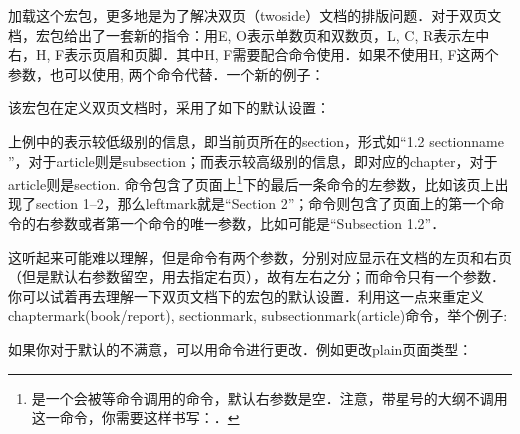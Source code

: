 加载这个宏包，更多地是为了解决双页（twoside）文档的排版问题．对于双页文档，宏包给出了一套新的指令：用E, O表示单数页和双数页，L, C, R表示左中右，H, F表示页眉和页脚．其中H, F需要配合命令使用．如果不使用H, F这两个参数，也可以使用,  两个命令代替．一个新的例子：
\begin{latex}
\fancyhead{} %
\fancyfoot{} %
    \fancyfoot[C]{\thepage}
\end{latex}

该宏包在定义双页文档时，采用了如下的默认设置：
\begin{latex}
\fancyhead[LE,RO]{\slshape \rightmark}
\fancyhead[LO,RE]{\slshape \leftmark}
\fancyfoot[C]{\thepage}
\end{latex}

上例中的表示较低级别的信息，即当前页所在的section，形式如“1.2 sectionname ”，对于article则是subsection；而表示较高级别的信息，即对应的chapter，对于article则是section. 命令包含了页面上\footnote{是一个会被等命令调用的命令，默认右参数是空．注意，带星号的大纲不调用这一命令，你需要这样书写：．}下的最后一条命令的左参数，比如该页上出现了section 1--2，那么leftmark就是“Section 2”；命令则包含了页面上的第一个命令的右参数或者第一个命令的唯一参数，比如可能是“Subsection 1.2”．

这听起来可能难以理解，但是命令有两个参数，分别对应显示在文档的左页和右页（但是默认右参数留空，用去指定右页），故有左右之分；而命令只有一个参数．你可以试着再去理解一下双页文档下的宏包的默认设置．利用这一点来重定义chaptermark(book/report), sectionmark, subsectionmark(article)命令，举个例子:
\begin{latex}
\renewcommand{\sectionmark}[1]{\markright{\thesection.\ #1}}
\renewcommand{\chaptermark}[1]{\markboth{\MakeUppercase{%
    \chaptername}\ \thechapter.\ #1}{}}
\end{latex}

如果你对于默认的不满意，可以用命令进行更改．例如更改plain页面类型：
\begin{latex}
\end{latex}

